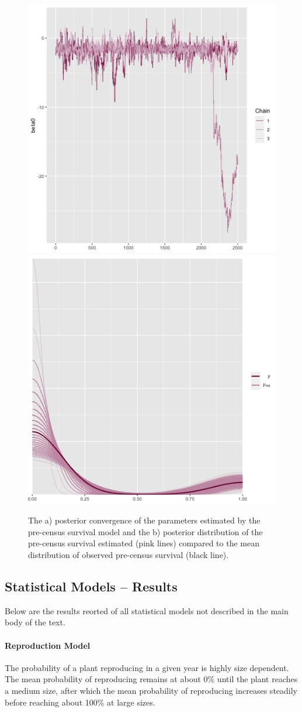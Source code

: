 \documentclass[11pt]{article}
\begin{document}
	\begin{figure}
		\includegraphics[width = 0.45\linewidth]{Figures/seed_surv_conv.png}
		\includegraphics[width=0.45\linewidth]{Figures/seed_surv_post.png}
		\caption{The a) posterior convergence of the parameters estimated by the pre-census survival model and the b) posterior distribution of the pre-census survival estimated (pink lines) compared to the mean distribution of observed pre-census survival (black line).}
		\label{fig:Pre_Surv_post}
	\end{figure}
	
	\subsection*{Statistical Models -- Results}
	Below are the results reorted of all statistical models not described in the main body of the text. 
	
	\paragraph{Reproduction Model}
	The probability of a plant reproducing in a given year is highly size dependent. 
	The mean probability of reproducing remains at about 0\% until the plant reaches a medium size, after which the mean probability of reproducing increases steadily before reaching about 100\% at large sizes. 
	
\end{document}
